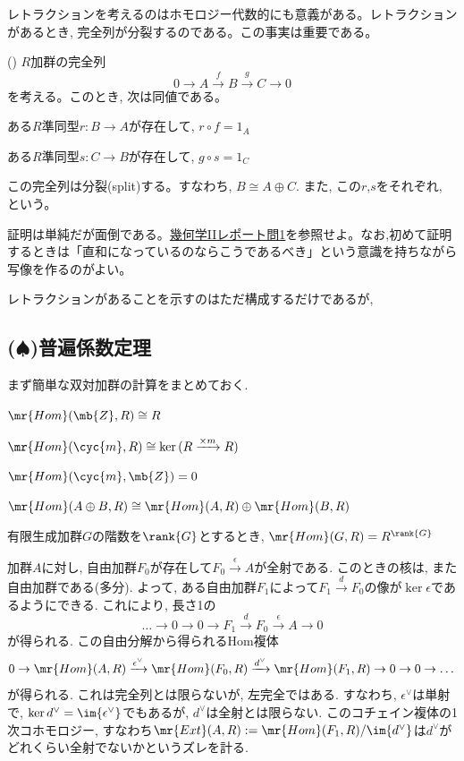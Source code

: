 レトラクションを考えるのはホモロジー代数的にも意義がある。レトラクションがあるとき, 完全列が分裂するのである。この事実は重要である。
\besha
\begin{prop} () \label{prop:splitting_lemma}
$R$加群の完全列
\[0\to A\xrightarrow{f} B\xrightarrow{g} C\to 0\]
を考える。このとき, 次は同値である。
\ben
\item ある$R$準同型$r:B\to A$が存在して, $r\circ f = 1_{A}$
\item ある$R$準同型$s:C\to B$が存在して, $g\circ s = 1_{C}$
\item この完全列は分裂(split)する。すなわち, $B\cong A\oplus C$.
\een
また, この$r$,$s$をそれぞれ, という。
\end{prop}
\ensha
証明は単純だが面倒である。\href{}{幾何学IIレポート問1}を参照せよ。なお,初めて証明するときは「直和になっているのならこうであるべき」という意識を持ちながら写像を作るのがよい。

レトラクションがあることを示すのはただ構成するだけであるが, 

\subsection{($\spadesuit$)普遍係数定理}
まず簡単な双対加群の計算をまとめておく. 

\begin{prop}
\ben 
\item $\mr{Hom}(\mb{Z},R)\cong R$
\item $\mr{Hom}(\cyc{m}, R) \cong \ker{(R\xrightarrow{\times m} R)}$
\item $\mr{Hom}(\cyc{m},\mb{Z}) = 0$
\item $\mr{Hom}(A\oplus B, R) \cong \mr{Hom}(A,R)\oplus \mr{Hom}(B,R)$ 
\item 有限生成加群$G$の階数を$\rank{G}$とするとき, $\mr{Hom}(G,R) = R^{\rank{G}}$
\een 
\end{prop}
加群$A$に対し, 自由加群$F_0$が存在して$F_0 \xrightarrow{\epsilon} A$が全射である. このときの核は, また自由加群である(多分). よって, ある自由加群$F_1$によって$F_1 \xrightarrow{d} F_0$の像が$\ker{\epsilon}$であるようにできる. これにより, 長さ1の
\[\dots \to 0\to 0\to F_1\xrightarrow{d} F_0 \xrightarrow{\epsilon} A \to 0\]
が得られる. この自由分解から得られるHom複体
\[0\to \mr{Hom}(A,R) \xrightarrow{\epsilon^{\lor}} \mr{Hom}(F_0,R) \xrightarrow{d^{\lor}} \mr{Hom}(F_1,R) \to 0 \to 0\to \dots\]
が得られる. これは完全列とは限らないが, 左完全ではある. すなわち, $\epsilon^{\lor}$は単射で, $\ker{d^{\lor}} = \im{\epsilon^{\lor}}$でもあるが,  $d^{\lor}$は全射とは限らない. このコチェイン複体の1次コホモロジー, すなわち$\mr{Ext}(A,R) := \mr{Hom}(F_1,R)/\im{d^{\lor}}$は$d^{\lor}$がどれくらい全射でないかというズレを計る. 

